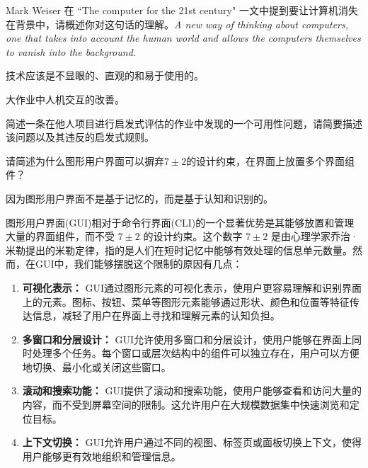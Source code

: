 \begin{problem}[2022]
Mark Weiser 在 ``The computer for the 21st century" 一文中提到要让计算机消失在背景中，请概述你对这句话的理解。\textit{A new way of thinking about computers, one that takes into account the human world and allows the computers themselves to vanish into the background.}
\end{problem}

\begin{solution}
技术应该是不显眼的、直观的和易于使用的。
\end{solution}



\begin{problem}[2014、2021]
大作业中人机交互的改善。

简述一条在他人项目进行启发式评估的作业中发现的一个可用性问题，请简要描述该问题以及其违反的启发式规则。
\end{problem}



\begin{problem}[2021、2023]
请简述为什么图形用户界面可以摒弃$7 \pm 2$的设计约束，在界面上放置多个界面组件？
\end{problem}

\begin{solution}
因为图形用户界面不是基于记忆的，而是基于认知和识别的。

图形用户界面(GUI)相对于命令行界面(CLI)的一个显著优势是其能够放置和管理大量的界面组件，而不受 $7 \pm 2$ 的设计约束。这个数字 $7 \pm 2$ 是由心理学家乔治·米勒提出的米勒定律，指的是人们在短时记忆中能够有效处理的信息单元数量。然而，在GUI中，我们能够摆脱这个限制的原因有几点：

\begin{enumerate}[label=\arabic*.]
    \item \textbf{可视化表示：} GUI通过图形元素的可视化表示，使用户更容易理解和识别界面上的元素。图标、按钮、菜单等图形元素能够通过形状、颜色和位置等特征传达信息，减轻了用户在界面上寻找和理解元素的认知负担。
    \item \textbf{多窗口和分层设计：} GUI允许使用多窗口和分层设计，使用户能够在界面上同时处理多个任务。每个窗口或层次结构中的组件可以独立存在，用户可以方便地切换、最小化或关闭这些窗口。
    \item \textbf{滚动和搜索功能：} GUI提供了滚动和搜索功能，使用户能够查看和访问大量的内容，而不受到屏幕空间的限制。这允许用户在大规模数据集中快速浏览和定位目标。
    \item \textbf{上下文切换：} GUI允许用户通过不同的视图、标签页或面板切换上下文，使得用户能够更有效地组织和管理信息。
\end{enumerate}
\end{solution}



